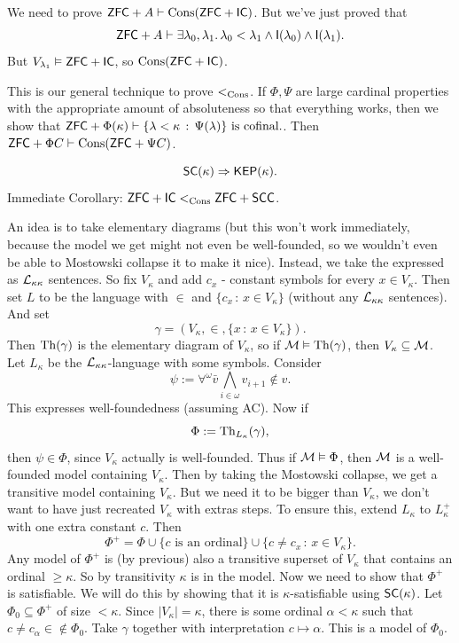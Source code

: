 \documentclass{article}
\begin{document}
\proof We need to prove $\mathsf{ZFC} + A \vdash \operatorname{Cons}(\mathsf{ZFC} + \mathsf{IC})$. But we've just proved that \[\mathsf{ZFC} + A \vdash \exists \lambda_{0}, \lambda_{1}. \, \lambda_{0} < \lambda_{1} \wedge \mathsf{I}(\lambda_{0}) \wedge \mathsf{I}(\lambda_{1}).\]
But $V_{\lambda_{1}} \vDash \mathsf{ZFC} + \mathsf{IC}$, so $\operatorname{Cons}(\mathsf{ZFC} + \mathsf{IC})$. \endproof 
\begin{remark*}
    This is our general technique to prove $<_{\operatorname{Cons}}$. If $\Phi, \Psi$ are large cardinal properties with the appropriate amount of absoluteness so that everything works, then we show that $\mathsf{ZFC} + \Phi(\kappa) \vdash \{\lambda < \kappa \, : \, \Psi(\lambda)\} \text{ is cofinal.}$. Then $\mathsf{ZFC} + \Phi C \vdash \operatorname{Cons}(\mathsf{ZFC} + \Psi C)$.
\end{remark*}
\begin{fancythm}{}
    \[ \mathsf{SC}(\kappa) \Rightarrow \mathsf{KEP}(\kappa).\]
    Immediate Corollary: $\mathsf{ZFC} + \mathsf{IC} <_{\operatorname{Cons}} \mathsf{ZFC} + \mathsf{SCC}$.
\end{fancythm}
\proof An idea is to take elementary diagrams (but this won't work immediately, because the model we get might not even be well-founded, so we wouldn't even be able to Mostowski collapse it to make it nice). Instead, we take the  expressed as $\mathcal{L}_{\kappa \kappa}$ sentences.\gap 
So fix $V_{\kappa}$ and add $c_{x}$ - constant symbols for every $x \in V_{\kappa}$. Then set $L$ to be the language with $\in$ and $\{c_{x} \, : \, x \in V_{\kappa}\}$ (without any $\mathcal{L}_{\kappa \kappa}$ sentences). And set \[ \gamma = \left(V_{\kappa}, \in, \{x \, : \, x \in V_{\kappa}\}\right).\] Then $\operatorname{Th}(\gamma)$ is the elementary diagram of $V_{\kappa}$, so if $\mathcal{M} \vDash \operatorname{Th}(\gamma)$, then $V_{\kappa} \subseteq \mathcal{M}$. Let $L_{\kappa}$ be the $\mathcal{L}_{\kappa \kappa}$-language with some symbols. Consider \[ \psi := \forall^{\omega} \bar{v} \bigwedge_{i \in \omega} v_{i+1} \notin v.\] This expresses well-foundedness (assuming AC). Now if \[ \Phi := \operatorname{Th}_{L_{\kappa}}(\gamma),\] then $\psi \in \Phi$, since $V_{\kappa}$ actually is well-founded. Thus if $\mathcal{M} \vDash \Phi$, then $\mathcal{M}$ is a well-founded model containing $V_{\kappa}$. Then by taking the Mostowski collapse, we get a transitive model containing $V_{\kappa}$. \gap 
But we need it to be bigger than $V_{\kappa}$, we don't want to have just recreated $V_{\kappa}$ with extras steps. To ensure this, extend $L_{\kappa}$ to $L_{\kappa}^{+}$ with one extra constant $c$. Then \[ \Phi^{+}= \Phi \cup \{ c \text{ is an ordinal} \} \cup \{c \neq c_{x} \, : \, x \in V_{\kappa}\}.\] Any model of $\Phi^{+}$ is (by previous) also a transitive superset of $V_{\kappa}$ that contains an ordinal $\geq \kappa$. So by transitivity $\kappa$ is in the model.\gap 
Now we need to show that $\Phi^{+}$ is satisfiable. We will do this by showing that it is $\kappa$-satisfiable using $\mathsf{SC}(\kappa)$. Let $\Phi_{0} \subseteq \Phi^{+}$ of size $< \kappa$. Since $|V_{\kappa}| = \kappa$, there is some ordinal $\alpha < \kappa$ such that $c \neq c_{\alpha} \in \notin \Phi_{0}$. Take $\gamma$ together with interpretation $c \mapsto \alpha$. This is a model of $\Phi_{0}$. \endproof 
\end{document}
